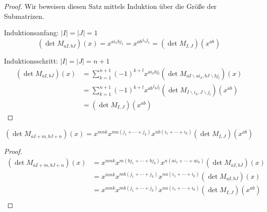\begin{proof}
    Wir beweisen diesen Satz mittels Induktion über die Größe der Submatrizen. 

    Induktionsanfang: $|I| = |J| = 1$
    \begin{equation*}
        \left( \det{} M_{aI,bJ} \right) (x) = x^{ai_1bj_1} = {x^{ab}}^{i_1j_1} = \left( \det{} M_{I,J} \right) (x^{ab})
    \end{equation*}

    Induktionsschritt: $|I| = |J| = n+1$
    \begin{align*}
        \left( \det{} M_{aI,bJ} \right) (x) &= \sum_{k=1}^{n+1} (-1)^{k+l} x^{ai_kbj_l} \left( \det M_{aI\backslash ai_k, bJ \backslash bj_l} \right) (x) \\
                                            &= \sum_{k=1}^{n+1} (-1)^{k+l} {x^{ab}}^{i_kj_l} \left( \det M_{I\backslash i_k, J \backslash j_l} \right) (x^{ab}) \\
                                            &= \left( \det{} M_{I,J} \right) (x^{ab})
    \end{align*}
\end{proof}

\begin{korollar}
    \begin{equation*}
        \left( \det{} M_{aI + m,bJ + n} \right) (x) = x^{mnk} x^{ma(j_1 +\cdots + j_k)} x^{nb(i_1+\cdots +i_k)} \left( \det{} M_{I,J} \right) (x^{ab})
    \end{equation*}
\end{korollar}

\begin{proof}
    \begin{align*}
        \left( \det{} M_{aI + m,bJ + n} \right) (x) &= x^{mnk} x^{m(bj_1 +\cdots + bj_k)} x^{n(ai_1+\cdots +ai_k)} \left( \det{} M_{aI,bJ} \right) (x) \\
                                                    &= x^{mnk} x^{mb(j_1 +\cdots + j_k)} x^{na(i_1+\cdots +i_k)} \left( \det{} M_{aI,bJ} \right) (x) \\
                                                    &= x^{mnk} x^{mb(j_1 +\cdots + j_k)} x^{na(i_1+\cdots +i_k)} \left( \det{} M_{I,J} \right) (x^{ab}) \\
    \end{align*}
\end{proof}